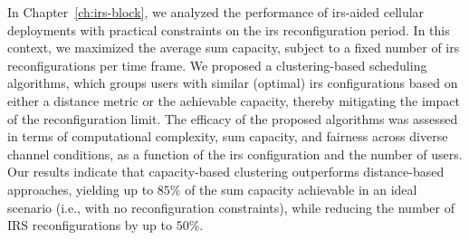 In Chapter~\ref{ch:irs-block}, we analyzed the performance of \gls{irs}-aided cellular deployments with practical constraints on the \gls{irs} reconfiguration period. In this context, we maximized the average sum capacity, subject to a fixed number of \gls{irs} reconfigurations per time frame. We proposed a clustering-based scheduling algorithms, which groups users with similar (optimal) \gls{irs} configurations based on either a distance metric or the achievable capacity, thereby mitigating the impact of the reconfiguration limit.
The efficacy of the proposed algorithms was assessed in terms of computational complexity, sum capacity, and fairness across diverse channel conditions, as a function of the \gls{irs} configuration and the number of users.
Our results indicate that capacity-based clustering outperforms distance-based approaches, yielding up to $85$\% of the sum capacity achievable in an ideal scenario (i.e., with no reconfiguration constraints), while reducing the number of IRS reconfigurations by up to $50$\%.
